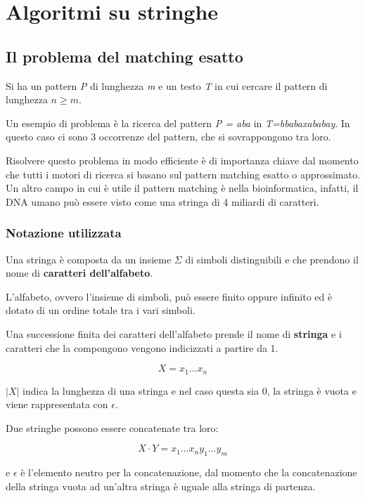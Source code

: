 \chapter{Algoritmi su stringhe}\label{algoritmi-su-stringhe}

\section{Il problema del matching esatto}\label{il-problema-del-matching-esatto}

Si ha un pattern \emph{P} di lunghezza \emph{m} e un testo \emph{T} in
cui cercare il pattern di lunghezza $n \geq m$.

Un esempio di problema è la ricerca del pattern \emph{P = aba} in
\emph{T=bbabaxababay}. In questo caso ci sono 3 occorrenze del pattern,
che si sovrappongono tra loro.

Risolvere questo problema in modo efficiente è di importanza chiave dal
momento che tutti i motori di ricerca si basano sul pattern matching
esatto o approssimato. Un altro campo in cui è utile il pattern matching
è nella bioinformatica, infatti, il DNA umano può essere visto come una
stringa di 4 miliardi di caratteri.

\subsection{Notazione utilizzata}\label{notazione-utilizzata}

Una stringa è composta da un insieme $\Sigma$ di simboli
distinguibili e che prendono il nome di \textbf{caratteri dell'alfabeto}.

L'alfabeto, ovvero l'insieme di simboli, può essere finito oppure
infinito ed è dotato di un ordine totale tra i vari simboli.

Una successione finita dei caratteri dell'alfabeto prende il nome di
\textbf{stringa} e i caratteri che la compongono vengono indicizzati a
partire da 1.

$$
X = x_1 \ldots x_n
$$

$|X|$ indica la lunghezza di una stringa e nel
caso questa sia 0, la stringa è vuota e viene rappresentata con
$\epsilon$.

Due stringhe possono essere concatenate tra loro:

$$
X \cdot Y = x_1\ldots x_ny_1\ldots y_m
$$

e $\epsilon$ è l'elemento neutro per la concatenazione, dal momento
che la concatenazione della stringa vuota ad un'altra stringa è uguale
alla stringa di partenza.

